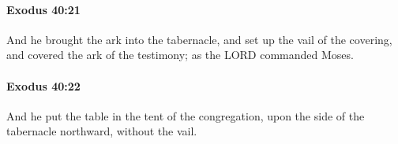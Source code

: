 		\paragraph{Exodus 40:21} %
			\label{EXODUS-40-21}

			And he brought the ark into the tabernacle, and set up the vail of the covering, and covered the ark of the testimony; as the LORD commanded Moses.


		\paragraph{Exodus 40:22} %
			\label{EXODUS-40-22}

			And he put the table in the tent of the congregation, upon the side of the tabernacle northward, without the vail.


